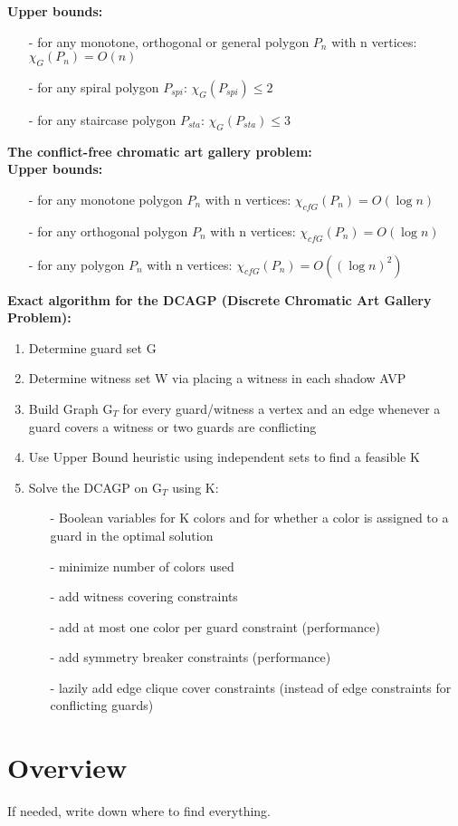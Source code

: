 \textbf{Upper bounds:}
\begin{enumerate}
    \item[-] for any monotone, orthogonal or general polygon $P_n$ with n vertices:  $\chi_G(P_n) = O(n)$ \cite{bartschi2011coloring}
    \item[-] for any spiral polygon $P_{spi}$: $\chi_G(P_{spi}) \leq 2$ \cite{erickson2012art}
    \item[-] for any staircase polygon $P_{sta}$: $\chi_G(P_{sta}) \leq 3$ \cite{erickson2012art}
\end{enumerate}
\textbf{The conflict-free chromatic art gallery problem:} \\
\textbf{Upper bounds:}
\begin{enumerate}
    \item[-] for any monotone polygon $P_n$ with n vertices:  $\chi_{cfG}(P_n) = O(\log n)$ \cite{bartschi2011coloring}
    \item[-] for any orthogonal polygon $P_n$ with n vertices:  $\chi_{cfG}(P_n) = O(\log n)$ \cite{bartschi2011coloring}
    \item[-] for any polygon $P_n$ with n vertices:  $\chi_{cfG}(P_n) = O((\log n)^2)$ \cite{bartschi2011coloring}
\end{enumerate}
\textbf{Exact algorithm for the DCAGP (Discrete Chromatic Art Gallery Problem):} \cite{zambon2014exact}
\begin{enumerate}
    \item Determine guard set G
    \item Determine witness set W via placing a witness in each shadow AVP
    \item Build Graph G$_T$ for every guard/witness a vertex and an edge whenever a guard covers a witness or two guards are conflicting
    \item Use Upper Bound heuristic using independent sets to find a feasible K
    \item Solve the DCAGP on G$_T$ using K:
    \begin{enumerate}
        \item[-] Boolean variables for K colors and for whether a color is assigned to a guard in the optimal solution
        \item[-] minimize number of colors used
        \item[-] add witness covering constraints
        \item[-] add at most one color per guard constraint (performance)
        \item[-] add symmetry breaker constraints (performance)
        \item[-] lazily add edge clique cover constraints (instead of edge constraints for conflicting guards)
    \end{enumerate}
\end{enumerate}

\section{Overview}
If needed, write down where to find everything.